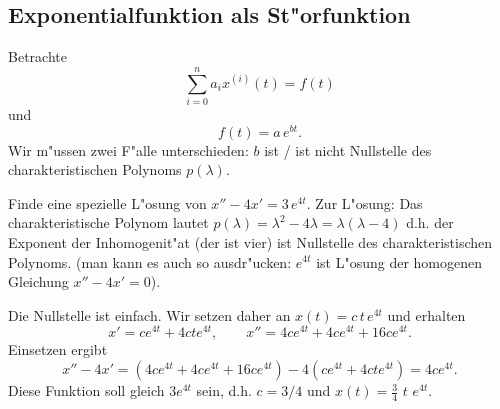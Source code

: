 \subsection{Exponentialfunktion als St"orfunktion}
Betrachte  
$$ \sum_{i=0}^n a_i x^{(i)}(t) = f(t)$$
und
$$ f(t) = a\,e^{bt}.$$
Wir m"ussen zwei F"alle unterschieden: $b$ ist / ist nicht Nullstelle des 
charakteristischen Polynoms $p(\lambda)$.\par\medskip
{}\par\medskip
{}

\begin{bspX}
Finde eine spezielle L"osung von $ x''-4x' = 3\,e^{4t}$. Zur L"osung:
Das charakteristische Polynom lautet $p(\lambda) = \lambda^2-4\lambda = \lambda(\lambda-4)$
d.h. der Exponent der Inhomogenit"at (der ist vier) ist Nullstelle des 
charakteristischen Polynoms. (man kann es auch so ausdr"ucken: $e^{4t}$ ist 
L"osung der homogenen Gleichung $x''-4x'=0$).\par
Die Nullstelle ist einfach. Wir setzen daher an
$ x(t) = c\, t \, e^{4t}$ und erhalten
$$ 
x' = c e^{4t}+4cte^{4t},\qquad
x'' = 4c e^{4t}+4ce^{4t}+16ce^{4t}.$$
Einsetzen ergibt
$$ x''-4x'
 = (4c e^{4t}+4ce^{4t}+16ce^{4t}) - 4(c e^{4t}+4cte^{4t})
= 4 c e^{4t}.
$$
Diese Funktion soll gleich $3 e^{4t}$ sein, d.h.
$ c = 3/4$ und $ x(t) = \frac 3 4 \,\, t\,\,e^{4t}.$
\end{bspX}
\begin{auf}\chb\label{block4A2}

\end{auf}
